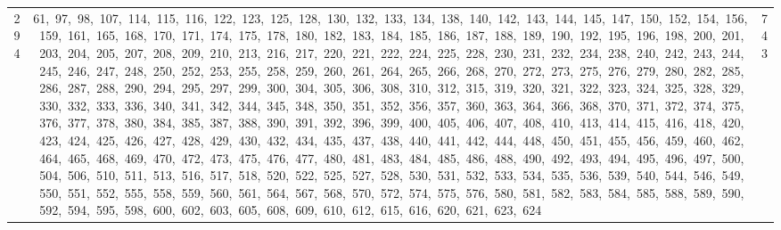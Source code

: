 \begin{longtable}{c|p{}|r}
294 & 61,\ 97,\ 98,\ 107,\ 114,\ 115,\ 116,\ 122,\ 123,\ 125,\ 128,\ 130,\ 132,\ 133,\ 134,\ 138,\ 140,\ 142,\ 143,\ 144,\ 145,\ 147,\ 150,\ 152,\ 154,\ 156,\ 159,\ 161,\ 165,\ 168,\ 170,\ 171,\ 174,\ 175,\ 178,\ 180,\ 182,\ 183,\ 184,\ 185,\ 186,\ 187,\ 188,\ 189,\ 190,\ 192,\ 195,\ 196,\ 198,\ 200,\ 201,\ 203,\ 204,\ 205,\ 207,\ 208,\ 209,\ 210,\ 213,\ 216,\ 217,\ 220,\ 221,\ 222,\ 224,\ 225,\ 228,\ 230,\ 231,\ 232,\ 234,\ 238,\ 240,\ 242,\ 243,\ 244,\ 245,\ 246,\ 247,\ 248,\ 250,\ 252,\ 253,\ 255,\ 258,\ 259,\ 260,\ 261,\ 264,\ 265,\ 266,\ 268,\ 270,\ 272,\ 273,\ 275,\ 276,\ 279,\ 280,\ 282,\ 285,\ 286,\ 287,\ 288,\ 290,\ 294,\ 295,\ 297,\ 299,\ 300,\ 304,\ 305,\ 306,\ 308,\ 310,\ 312,\ 315,\ 319,\ 320,\ 321,\ 322,\ 323,\ 324,\ 325,\ 328,\ 329,\ 330,\ 332,\ 333,\ 336,\ 340,\ 341,\ 342,\ 344,\ 345,\ 348,\ 350,\ 351,\ 352,\ 356,\ 357,\ 360,\ 363,\ 364,\ 366,\ 368,\ 370,\ 371,\ 372,\ 374,\ 375,\ 376,\ 377,\ 378,\ 380,\ 384,\ 385,\ 387,\ 388,\ 390,\ 391,\ 392,\ 396,\ 399,\ 400,\ 405,\ 406,\ 407,\ 408,\ 410,\ 413,\ 414,\ 415,\ 416,\ 418,\ 420,\ 423,\ 424,\ 425,\ 426,\ 427,\ 428,\ 429,\ 430,\ 432,\ 434,\ 435,\ 437,\ 438,\ 440,\ 441,\ 442,\ 444,\ 448,\ 450,\ 451,\ 455,\ 456,\ 459,\ 460,\ 462,\ 464,\ 465,\ 468,\ 469,\ 470,\ 472,\ 473,\ 475,\ 476,\ 477,\ 480,\ 481,\ 483,\ 484,\ 485,\ 486,\ 488,\ 490,\ 492,\ 493,\ 494,\ 495,\ 496,\ 497,\ 500,\ 504,\ 506,\ 510,\ 511,\ 513,\ 516,\ 517,\ 518,\ 520,\ 522,\ 525,\ 527,\ 528,\ 530,\ 531,\ 532,\ 533,\ 534,\ 535,\ 536,\ 539,\ 540,\ 544,\ 546,\ 549,\ 550,\ 551,\ 552,\ 555,\ 558,\ 559,\ 560,\ 561,\ 564,\ 567,\ 568,\ 570,\ 572,\ 574,\ 575,\ 576,\ 580,\ 581,\ 582,\ 583,\ 584,\ 585,\ 588,\ 589,\ 590,\ 592,\ 594,\ 595,\ 598,\ 600,\ 602,\ 603,\ 605,\ 608,\ 609,\ 610,\ 612,\ 615,\ 616,\ 620,\ 621,\ 623,\ 624 & 743 \\

\end{longtable}
